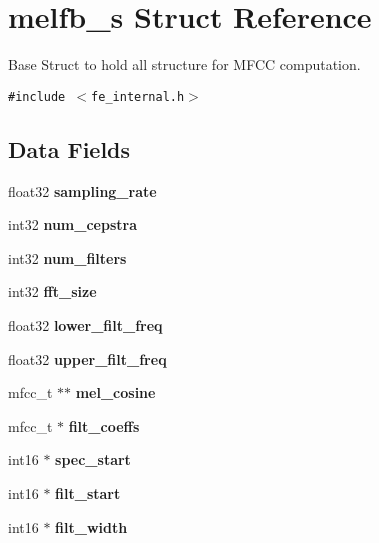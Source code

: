 \section{melfb\_\-s Struct Reference}
\label{structmelfb__s}
Base Struct to hold all structure for MFCC computation.  


{\tt \#include $<$fe\_\-internal.h$>$}

\subsection*{Data Fields}
\begin{CompactItemize}
\item 
float32 \textbf{sampling\_\-rate}\label{structmelfb__s_6481b2124bb1c1f2dd17cfaceef34b10}

\item 
int32 \textbf{num\_\-cepstra}\label{structmelfb__s_1f196e53dd4933196b2a3aef1d2597a6}

\item 
int32 \textbf{num\_\-filters}\label{structmelfb__s_3cb5379f4a24effa719296edaf484109}

\item 
int32 \textbf{fft\_\-size}\label{structmelfb__s_9af4273d9de3551b7ce782618d9acb3b}

\item 
float32 \textbf{lower\_\-filt\_\-freq}\label{structmelfb__s_11a5ccdcbffb5e1cc21909c4af30d494}

\item 
float32 \textbf{upper\_\-filt\_\-freq}\label{structmelfb__s_c94388ee3f0ac984a0957fc90eb8bf6c}

\item 
mfcc\_\-t $\ast$$\ast$ \textbf{mel\_\-cosine}\label{structmelfb__s_8836cd634ec20bc853d3c70e0c5fb768}

\item 
mfcc\_\-t $\ast$ \textbf{filt\_\-coeffs}\label{structmelfb__s_37da6d455b352696ac8340d1e77c622f}

\item 
int16 $\ast$ \textbf{spec\_\-start}\label{structmelfb__s_2586c719e90eb09baadc11add2ba3fbb}

\item 
int16 $\ast$ \textbf{filt\_\-start}\label{structmelfb__s_24cdb5e426b96d0e97720dfad3a70df0}

\item 
int16 $\ast$ \textbf{filt\_\-width}\label{structmelfb__s_43c26968a65602f1dce3c02e155eea39}


\end{CompactItemize}
